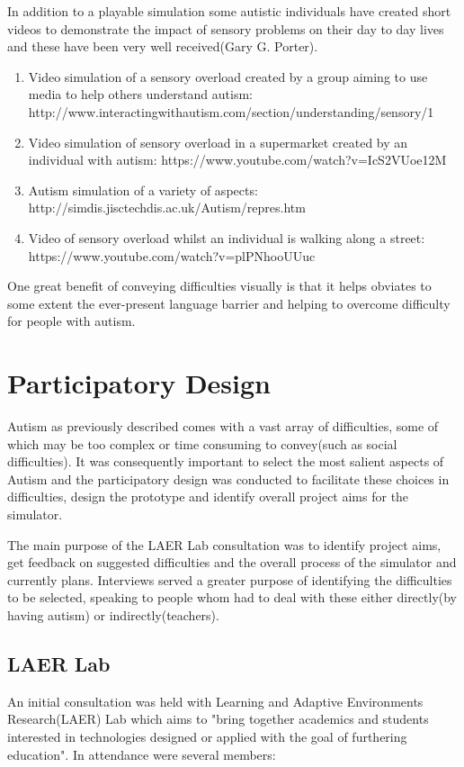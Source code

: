 \documentclass[11pt]{report}
\begin{document}
In addition to a playable simulation some autistic individuals have created short videos to demonstrate the impact of sensory problems on their day to day lives and these have been very well received(Gary G. Porter). 
\begin{enumerate}
\item Video simulation of a sensory overload created by a group aiming to use media to help others understand autism: http://www.interactingwithautism.com/section/understanding/sensory/1
\item Video simulation of sensory overload in a supermarket created by an individual with autism: https://www.youtube.com/watch?v=IcS2VUoe12M
\item Autism simulation of a variety of aspects: http://simdis.jisctechdis.ac.uk/Autism/repres.htm
\item Video of sensory overload whilst an individual is walking along a street: https://www.youtube.com/watch?v=plPNhooUUuc
\end{enumerate}

One great benefit of conveying difficulties visually is that it helps obviates to some extent the ever-present language barrier and helping to overcome difficulty for people with autism.  

\chapter{Participatory Design}
Autism as previously described comes with a vast array of difficulties, some of which may be too complex or time consuming to convey(such as social difficulties). It was consequently important to select the most salient aspects of Autism and the participatory design was conducted to facilitate these choices in difficulties, design the prototype and identify overall project aims for the simulator. 

The main purpose of the LAER Lab consultation was to identify project aims, get feedback on suggested difficulties and the overall process of the simulator and currently plans. Interviews served a greater purpose of identifying the difficulties to be selected, speaking to people whom had to deal with these either directly(by having autism) or indirectly(teachers).

\section{LAER Lab}
\label{sec:laer_partdesign}
An initial consultation was held with Learning and Adaptive Environments Research(LAER) Lab which aims to "bring together academics and students interested in technologies designed or applied with the goal of furthering education". In attendance were several members:
\end{document}
